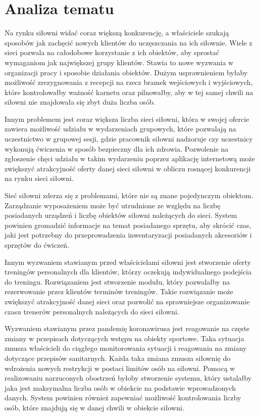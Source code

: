 \documentclass[a4paper,twoside,12pt]{book}
\begin{document}
\chapter{Analiza tematu}
Na rynku siłowni widać coraz większą konkurencję, a właściciele szukają sposobów jak zachęcić nowych klientów do uczęszczania na ich siłownie. Wiele z sieci pozwala na całodobowe korzystanie z ich obiektów, aby sprostać wymaganiom jak największej grupy klientów. Stawia to nowe wyzwania w organizacji pracy i sposobie działania obiektów. Dużym usprawnieniem byłaby możliwość zrezygnowania z recepcji na rzecz bramek wejściowych i wyjściowych, które kontrolowałby ważność karnetu oraz pilnowałby, aby w tej samej chwili na siłowni nie znajdowała się zbyt duża liczba osób.

Innym problemem jest coraz większa liczba sieci siłowni, która w swojej ofercie zawiera możliwość udziału w wydarzeniach grupowych, które pozwalają na uczestnictwo w grupowej sesji, gdzie pracownik siłowni nadzoruje czy uczestnicy wykonują ćwiczenia w sposób bezpieczny dla ich zdrowia. Pozwolenie na zgłoszenie chęci udziału w takim wydarzeniu poprzez aplikację internetową może zwiększyć atrakcyjność oferty danej sieci siłowni w obliczu rosnącej konkurencji na rynku sieci siłowni.

Sieć siłowni zderza się z problemami, które nie są znane pojedynczym obiektom. Zarządzanie wyposażeniem może być utrudnione ze względu na liczbę posiadanych urządzeń i liczbę obiektów siłowni należących do sieci. System powinien gromadzić informacje na temat posiadanego sprzętu, aby skrócić czas, jaki jest potrzebny do przeprowadzenia inwentaryzacji posiadanych akcesoriów i sprzętów do ćwiczeń.

Innym wyzwaniem stawianym przed właścicielami siłowni jest stworzenie oferty treningów personalnych dla klientów, którzy oczekują indywidualnego podejścia do treningu. Rozwiązaniem jest stworzenie modułu, który pozwalałby na rezerwowanie przez klientów terminów treningów. Takie rozwiązanie może zwiększyć atrakcyjność danej sieci oraz pozwolić na sprawniejsze organizowanie czasu trenerów personalnych należących do sieci siłowni.

Wyzwaniem stawianym przez pandemię koronawirusa jest reagowanie na częste zmiany w przepisach dotyczących wstępu na obiekty sportowe. Taka sytuacja zmusza właścicieli do ciągłego monitorowania sytuacji i reagowania na zmiany dotyczące przepisów sanitarnych. Każda taka zmiana zmusza siłownię do wdrożenia nowych restrykcji w postaci limitów osób na siłowni. Pomocą w realizowaniu narzuconych obostrzeń byłoby stworzenie systemu, który ustalałby jaka jest maksymalna liczba osób w obiekcie na podstawie wprowadzonych danych. System powinien również zapewniać możliwość kontrolowania liczby osób, które znajdują się w danej chwili w obiekcie siłowni.
\end{document}

